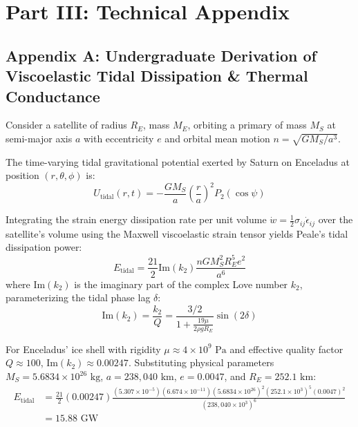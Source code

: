 \documentclass[11pt,a4paper]{article}
\begin{document}
\newpage

\section*{Part III: Technical Appendix}

\subsection*{Appendix A: Undergraduate Derivation of Viscoelastic Tidal Dissipation \& Thermal Conductance}

Consider a satellite of radius $R_E$, mass $M_E$, orbiting a primary of mass $M_S$ at semi-major axis $a$ with eccentricity $e$ and orbital mean motion $n = \sqrt{G M_S / a^3}$.

The time-varying tidal gravitational potential exerted by Saturn on Enceladus at position $(r, \theta, \phi)$ is:
\begin{equation}
U_{\text{tidal}}(r, t) = -\frac{G M_S}{a} \left(\frac{r}{a}\right)^2 P_2(\cos \psi)
\end{equation}

Integrating the strain energy dissipation rate per unit volume $\dot{w} = \frac{1}{2} \sigma_{ij} \dot{\epsilon}_{ij}$ over the satellite's volume using the Maxwell viscoelastic strain tensor yields Peale's tidal dissipation power:
\begin{equation}
E_{\text{tidal}} = \frac{21}{2} \text{Im}(k_2) \frac{n G M_S^2 R_E^5 e^2}{a^6}
\end{equation}
where $\text{Im}(k_2)$ is the imaginary part of the complex Love number $k_2$, parameterizing the tidal phase lag $\delta$:
\begin{equation}
\text{Im}(k_2) = \frac{k_2}{Q} = \frac{3/2}{1 + \frac{19 \mu}{2 \rho g R_E}} \sin (2 \delta)
\end{equation}

For Enceladus' ice shell with rigidity $\mu \approx 4 \times 10^9\text{ Pa}$ and effective quality factor $Q \approx 100$, $\text{Im}(k_2) \approx 0.00247$. Substituting physical parameters $M_S = 5.6834 \times 10^{26}\text{ kg}$, $a = 238,040\text{ km}$, $e = 0.0047$, and $R_E = 252.1\text{ km}$:
\begin{equation}
\begin{aligned}
E_{\text{tidal}} &= \frac{21}{2} (0.00247) \frac{(5.307 \times 10^{-5}) (6.674 \times 10^{-11}) (5.6834 \times 10^{26})^2 (252.1 \times 10^3)^5 (0.0047)^2}{(238,040 \times 10^3)^6} \\
&= 15.88\text{ GW}
\end{aligned}
\end{equation}
\end{document}
